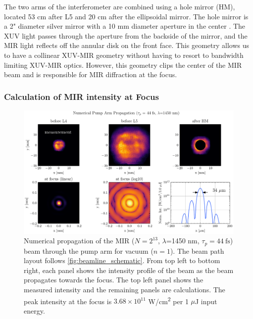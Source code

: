 The two arms of the interferometer are combined using a hole mirror (HM), located 53 cm after L5 and 20 cm after the ellipsoidal mirror. The hole mirror is a 2" diameter silver mirror with a 10 mm diameter aperture in the center \cite{peatrossHighorderHarmonicGeneration1994}. The XUV light passes through the aperture from the backside of the mirror, and the MIR light reflects off the annular disk on the front face. This geometry allows us to have a collinear XUV-MIR geometry without having to resort to bandwidth limiting XUV-MIR optics. However, this geometry clips the center of the MIR beam and is responsible for MIR diffraction at the focus.

\subsubsection{Calculation of MIR intensity at Focus}
\label{sec:Pump_Arm_Focus_Calculations}

\begin{figure}
	\centering
	\includegraphics[width=1.0\textwidth]{figures/chap2/pump_on_focus_calculation_8192_1.45_4.4e-14.pdf}
	\caption{Numerical propagation of the MIR ($N=2^{13}$, $\lambda$=1450 nm, $\tau_p = 44 \ \textrm{fs}$) beam through the pump arm for vacuum ($n=1$). The beam path layout follows \cref{fig:beamline_schematic}. From top left to bottom right, each panel shows the intensity profile of the beam as the beam propagates towards the focus. The top left panel shows the measured intensity and the remaining panels are calculations. The peak intensity at the focus is $3.68 \times 10^{11}$ W/cm\textsuperscript{2} per 1 $\mu$J input energy.}
	\label{fig:pump_on_focus_calculation}
\end{figure}

